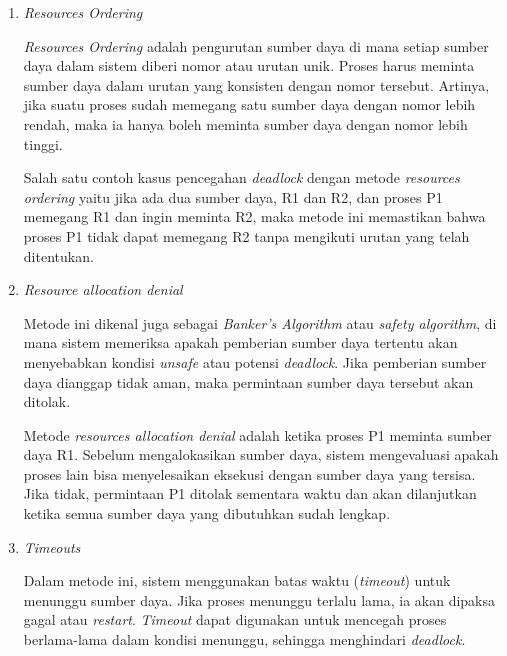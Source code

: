 \documentclass[12pt]{article}
\begin{document}
\begin{enumerate}
    \item \textit{Resources Ordering}

          \hspace{1cm}\textit{Resources Ordering} adalah pengurutan sumber daya di mana setiap sumber daya
          dalam sistem diberi nomor atau urutan unik. Proses harus meminta sumber daya
          dalam urutan yang konsisten dengan nomor tersebut. Artinya, jika suatu proses
          sudah memegang satu sumber daya dengan nomor lebih rendah, maka ia hanya boleh
          meminta sumber daya dengan nomor lebih tinggi.

          \hspace{1cm}Salah satu contoh kasus pencegahan \textit{deadlock} dengan metode \textit{resources
          ordering} yaitu jika ada dua sumber daya, R1 dan R2, dan proses P1 memegang R1 dan ingin
          meminta R2, maka metode ini memastikan bahwa proses P1 tidak dapat memegang R2
          tanpa mengikuti urutan yang telah ditentukan.

    \item \textit{Resource allocation denial}

          \hspace{1cm}Metode ini dikenal juga sebagai \textit{Banker's
          Algorithm} atau \textit{safety algorithm}, di mana sistem memeriksa apakah pemberian
          sumber daya tertentu akan menyebabkan kondisi \textit{unsafe} atau potensi \textit{deadlock}.
          Jika pemberian sumber daya dianggap tidak aman, maka permintaan sumber daya
          tersebut akan ditolak.

          \hspace{1cm}Metode \textit{resources allocation denial} adalah ketika
          proses P1 meminta sumber daya R1. Sebelum mengalokasikan sumber daya, sistem mengevaluasi
          apakah proses lain bisa menyelesaikan eksekusi dengan sumber daya yang tersisa.
          Jika tidak, permintaan P1 ditolak sementara waktu dan akan dilanjutkan ketika semua sumber daya yang dibutuhkan sudah lengkap.

    \item \textit{Timeouts}

          \hspace{1cm}Dalam metode ini, sistem menggunakan batas waktu (\textit{timeout})
          untuk menunggu sumber daya. Jika proses menunggu terlalu lama, ia akan dipaksa
          gagal atau \textit{restart}. \textit{Timeout} dapat digunakan untuk mencegah proses berlama-lama
          dalam kondisi menunggu, sehingga menghindari \textit{deadlock}.


\end{enumerate}
\end{document}
